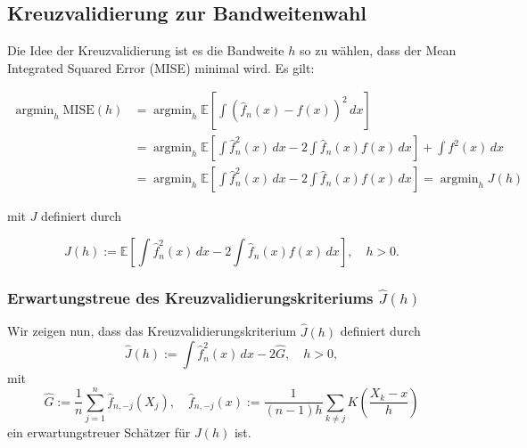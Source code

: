 \documentclass[10pt,]{article}
\DeclareMathOperator*{\argmin}{argmin}
\begin{document}
\subsection{Kreuzvalidierung zur
Bandweitenwahl}\label{kreuzvalidierung-zur-bandweitenwahl}

Die Idee der Kreuzvalidierung ist es die Bandweite \(h\) so zu wählen,
dass der Mean Integrated Squared Error (MISE) minimal wird. Es gilt:

\[
\begin{aligned}
\argmin_h \text{MISE}(h) &= \argmin_h \mathbb{E} \left[ \int (\hat{f}_n(x) - f(x))^2 \, dx \right] \\
&= \argmin_h \mathbb{E} \left[ \int \hat{f}_n^2(x) \, dx - 2 \int \hat{f}_n(x) f(x) \, dx \right] + \int f^2(x) \, dx \\
&= \argmin_h \mathbb{E} \left[ \int \hat{f}_n^2(x) \, dx - 2 \int \hat{f}_n(x) f(x) \, dx \right] = \argmin_h J(h)
\end{aligned}
\]

mit \(J\) definiert durch

\[
J(h) := \mathbb{E} \left[ \int \hat{f}_n^2(x) \, dx - 2 \int \hat{f}_n(x) f(x) \, dx \right] , \quad h >0.
\]

\subsubsection{\texorpdfstring{Erwartungstreue des
Kreuzvalidierungskriteriums
\(\hat{J}(h)\)}{Erwartungstreue des Kreuzvalidierungskriteriums \textbackslash{}hat\{J\}(h)}}\label{erwartungstreue-des-kreuzvalidierungskriteriums-hatjh}

Wir zeigen nun, dass das Kreuzvalidierungskriterium \(\hat{J}(h)\)
definiert durch \[
\hat{J}(h) := \int \hat{f}_n^2(x) \, dx - 2 \hat{G}, \quad h >0,
\] mit \[
\hat{G} := \frac{1}{n} \sum_{j=1}^n \hat{f}_{n,-j}(X_j), \quad \hat{f}_{n,-j}(x) := \frac{1}{(n-1)h} \sum_{k\not=j} K\left( \frac{X_k-x}{h} \right)
\] ein erwartungstreuer Schätzer für \(J(h)\) ist.
\end{document}
